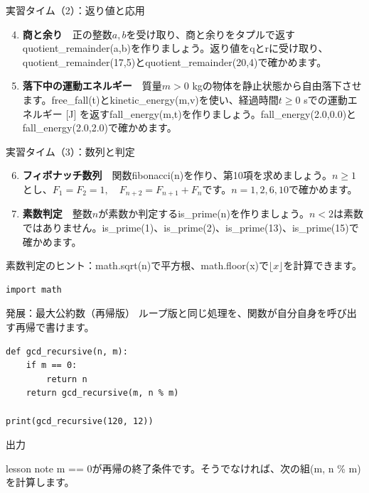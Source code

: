\documentclass[12pt,aspectratio=43]{beamer}
\newcommand{\code}[1]{{\codefont #1}}
\newcommand{\result}[1]{%
  \par\vspace{1mm}%
  {\small\textcolor{black!60}{出力}}\quad
  {\codefont\fontsize{16}{18}\selectfont #1}\par}
\newenvironment{lessonbox}
  {\begin{beamercolorbox}[wd=\linewidth,sep=1.5mm]{lesson note}}
  {\end{beamercolorbox}\par}
\begin{document}
\begin{frame}[t]{実習タイム（2）：返り値と応用}
  \setlength{\parskip}{0pt}
  \small
  \begin{enumerate}
    \setcounter{enumi}{3}
    \setlength{\itemsep}{4mm}
    \item \textbf{商と余り}　正の整数\(a,b\)を受け取り、商と余りをタプルで返す\code{quotient\_remainder(a,b)}を作りましょう。返り値を\code{q}と\code{r}に受け取り、\code{quotient\_remainder(17,5)}と\code{quotient\_remainder(20,4)}で確かめます。
    \item \textbf{落下中の運動エネルギー}　質量\(m>0\) kgの物体を静止状態から自由落下させます。\code{free\_fall(t)}と\code{kinetic\_energy(m,v)}を使い、経過時間\(t\geq0\) sでの運動エネルギー [J] を返す\code{fall\_energy(m,t)}を作りましょう。\code{fall\_energy(2.0,0.0)}と\code{fall\_energy(2.0,2.0)}で確かめます。
  \end{enumerate}
\end{frame}

\begin{frame}[t,fragile]{実習タイム（3）：数列と判定}
  \setlength{\parskip}{0pt}
  \small
  \begin{enumerate}
    \setcounter{enumi}{5}
    \setlength{\itemsep}{2mm}
    \item \textbf{フィボナッチ数列}　関数\code{fibonacci(n)}を作り、第10項を求めましょう。\(n\geq1\)とし、\(F_1=F_2=1,\quad F_{n+2}=F_{n+1}+F_n\)です。\(n=1,2,6,10\)で確かめます。
    \item \textbf{素数判定}　整数\(n\)が素数か判定する\code{is\_prime(n)}を作りましょう。\(n<2\)は素数ではありません。\code{is\_prime(1)}、\code{is\_prime(2)}、\code{is\_prime(13)}、\code{is\_prime(15)}で確かめます。
  \end{enumerate}
  \vspace{1mm}
  素数判定のヒント：\code{math.sqrt(n)}で平方根、\code{math.floor(x)}で\(\lfloor x\rfloor\)を計算できます。
\begin{lstlisting}[aboveskip=1mm,belowskip=0mm]
import math
\end{lstlisting}
\end{frame}

\begin{frame}[t,fragile]{発展：最大公約数（再帰版）}
  \setlength{\parskip}{0pt}
  ループ版と同じ処理を、関数が自分自身を呼び出す再帰で書けます。
\begin{lstlisting}
def gcd_recursive(n, m):
    if m == 0:
        return n
    return gcd_recursive(m, n % m)

print(gcd_recursive(120, 12))
\end{lstlisting}
  \result{12}
  \begin{lessonbox}
    \small \code{m == 0}が再帰の終了条件です。そうでなければ、次の組\code{(m, n \% m)}を計算します。
  \end{lessonbox}
\end{frame}
\end{document}
